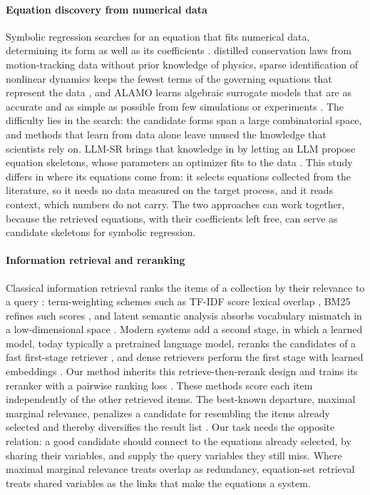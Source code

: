 \paragraph{Equation discovery from numerical data} Symbolic regression searches for an equation
that fits numerical data, determining its form as well as its coefficients \citep{AIFeynman}.
\citet{SchmidtLipson} distilled conservation laws from motion-tracking data without prior knowledge
of physics, sparse identification of nonlinear dynamics keeps the fewest terms of the governing
equations that represent the data \citep{SINDy}, and ALAMO learns algebraic surrogate models that
are as accurate and as simple as possible from few simulations or experiments \citep{ALAMO}. The
difficulty lies in the search: the candidate forms span a large combinatorial space, and
methods that learn from data alone leave unused the knowledge that scientists rely on. LLM-SR
brings that knowledge in by letting an LLM propose equation skeletons, whose parameters an
optimizer fits to the data \citep{LLMSR}. This study differs in where its equations come from: it
selects equations collected from the literature, so it needs no data measured on the target
process, and it reads context, which numbers do not carry. The two approaches can work
together, because the retrieved equations, with their coefficients left free, can serve as
candidate skeletons for symbolic regression.

\paragraph{Information retrieval and reranking} Classical information retrieval ranks the items of
a collection by their relevance to a query \citep{Manning}: term-weighting schemes such as TF-IDF
score lexical overlap \citep{Salton}, BM25 refines such scores \citep{BM25}, and latent semantic
analysis absorbs vocabulary mismatch in a low-dimensional space \citep{LSA}. Modern systems add a
second stage, in which a learned model, today typically a pretrained language model, reranks the
candidates of a fast first-stage retriever \citep{BERT,BERTrerank}, and dense retrievers perform
the first stage with learned embeddings \citep{DPR}. Our method inherits this retrieve-then-rerank
design and trains its reranker with a pairwise ranking loss \citep{LTR}. These methods score each
item independently of the other retrieved items. The best-known departure, maximal marginal
relevance, penalizes a candidate for resembling the items already selected and thereby diversifies
the result list \citep{MMR}. Our task needs the opposite relation: a good candidate should connect
to the equations already selected, by sharing their variables, and supply the query variables they
still miss. Where maximal marginal relevance treats overlap as redundancy, equation-set retrieval
treats shared variables as the links that make the equations a system.

